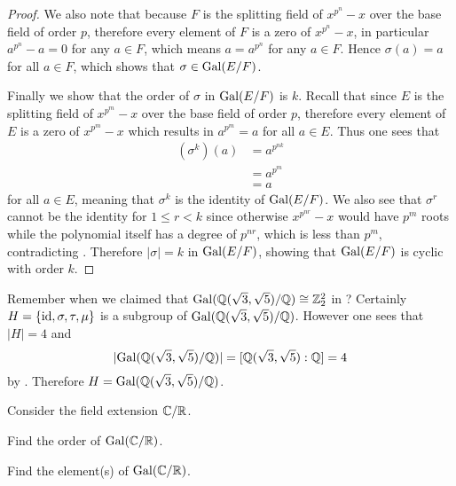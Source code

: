 \begin{proof}
    We also note that because $F$ is the splitting field of $x^{p^n}-x$ over the base field of order $p$, therefore every element of $F$ is a zero of $x^{p^n}-x$, in particular $a^{p^n} - a = 0$ for any $a \in F$, which means $a = a^{p^n}$ for any $a \in F$. Hence $\sigma(a) = a$ for all $a \in F$, which shows that $\sigma \in \mathrm{Gal}(E/F)$.

    Finally we show that the order of $\sigma$ in $\mathrm{Gal}(E/F)$ is $k$. Recall that since $E$ is the splitting field of $x^{p^m} - x$ over the base field of order $p$, therefore every element of $E$ is a zero of $x^{p^m} - x$ which results in $a^{p^m} = a$ for all $a \in E$. Thus one sees that
    \begin{align*}
        (\sigma^k)(a) &= a^{p^{nk}}\\
        &= a^{p^m}\\
        &= a
    \end{align*}
    for all $a \in E$, meaning that $\sigma^k$ is the identity of $\mathrm{Gal}(E/F)$. We also see that $\sigma^r$ cannot be the identity for $1 \leq r < k$ since otherwise $x^{p^{nr}} - x$ would have $p^m$ roots while the polynomial itself has a degree of $p^{nr}$, which is less than $p^m$, contradicting . Therefore $|\sigma| = k$ in $\mathrm{Gal}(E/F)$, showing that $\mathrm{Gal}(E/F)$ is cyclic with order $k$.
\end{proof}

\begin{example}
    Remember when we claimed that $\mathrm{Gal}(\mathbb{Q}(\sqrt3,\sqrt5)/\mathbb{Q}) \cong \mathbb{Z}_2^2$ in ? Certainly $H = \{\mathrm{id}, \sigma, \tau, \mu\}$ is a subgroup of $\mathrm{Gal}(\mathbb{Q}(\sqrt3,\sqrt5)/\mathbb{Q})$. However one sees that $|H| = 4$ and
    \[
        |\mathrm{Gal}(\mathbb{Q}(\sqrt3,\sqrt5)/\mathbb{Q})| = [\mathbb{Q}(\sqrt3,\sqrt5):\mathbb{Q}] = 4
    \]
    by . Therefore $H = \mathrm{Gal}(\mathbb{Q}(\sqrt3,\sqrt5)/\mathbb{Q})$.
\end{example}

\begin{exercise}
    Consider the field extension $\mathbb{C}/\mathbb{R}$.
    \begin{partquestions}{\roman*}
        \item Find the order of $\mathrm{Gal}(\mathbb{C}/\mathbb{R})$.
        \item Find the element(s) of $\mathrm{Gal}(\mathbb{C}/\mathbb{R})$.
    \end{partquestions}
\end{exercise}

